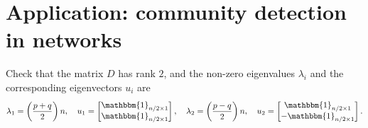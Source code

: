 \section{Application: community detection in networks}
\begin{problem*}[Exercise 4.5.2]\label{ex4.5.2}
	Check that the matrix \(D\) has rank \(2\), and the non-zero eigenvalues \(\lambda _i\) and the corresponding eigenvectors \(u_i\) are
	\[
		\lambda _1 = \left( \frac{p+q}{2} \right) n, \quad
		u_1 = \begin{bmatrix}
			\mathbbm{1}_{n / 2 \times 1} \\
			\mathbbm{1}_{n / 2 \times 1} \\
		\end{bmatrix} ,\quad
		\lambda _2 = \left( \frac{p-q}{2} \right) n,\quad
		u_2 = \begin{bmatrix}
			\mathbbm{1}_{n / 2 \times 1}   \\
			- \mathbbm{1}_{n / 2 \times 1} \\
		\end{bmatrix}.
	\]
\end{problem*}
